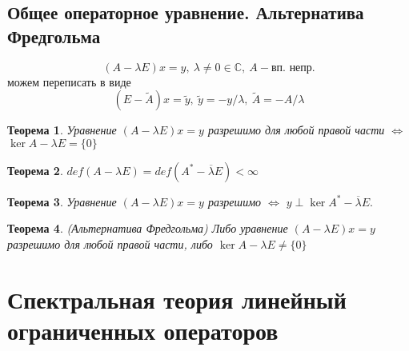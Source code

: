 \documentclass[9pt, a4paper]{extarticle}
\newtheorem{theorem}{Теорема}
\numberwithin{equation}{section}
\numberwithin{lemma}{section}
\numberwithin{definition}{section}
\numberwithin{notabene}{section}
\numberwithin{corollary}{section}
\begin{document}
\subsection{Общее операторное уравнение. Альтернатива Фредгольма}
	\begin{equation*}
		(A - \lambda E) x = y, \ \lambda \neq 0 \in \mathbb{C}, \ A - \text{вп. непр.}
	\end{equation*}
	можем переписать в виде
	\begin{equation*}
		(E - \tilde{A}) x = \tilde{y}, \ \tilde{y} = -y / \lambda, \ \tilde{A}= - A / \lambda
	\end{equation*}
	\begin{theorem}
		Уравнение $	(A - \lambda E) x = y$ разрешимо для любой правой части $\Leftrightarrow$ $\ker{A - \lambda E} = \{0\}$
	\end{theorem}
	\begin{theorem}
		$def (A - \lambda E) = def (A^* - \overline{\lambda} E) < \infty$
	\end{theorem}
	\begin{theorem}
		Уравнение $	(A - \lambda E) x = y$ разрешимо $\Leftrightarrow$ $y \perp \ker{A^* - \overline{\lambda} E}.$
	\end{theorem}
	\begin{theorem}
		(Альтернатива Фредгольма)\newline
		Либо уравнение $	(A - \lambda E) x = y$ разрешимо для любой правой части, либо $\ker{A - \lambda E} \neq \{0\}$
	\end{theorem}
\section{Спектральная теория линейный ограниченных операторов}
\end{document}
